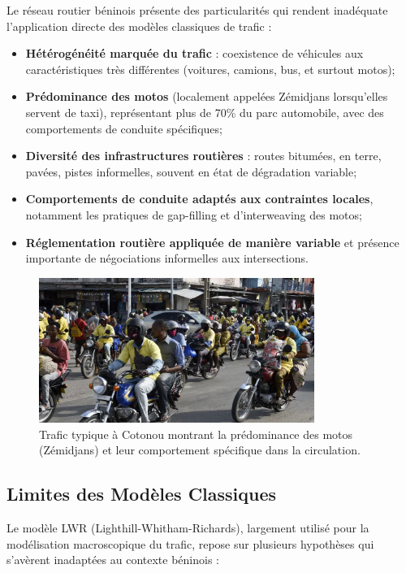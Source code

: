 Le réseau routier béninois présente des particularités qui rendent inadéquate l'application directe des modèles classiques de trafic :

\begin{itemize}
\item \textbf{Hétérogénéité marquée du trafic} : coexistence de véhicules aux caractéristiques très différentes (voitures, camions, bus, et surtout motos);
\item \textbf{Prédominance des motos} (localement appelées Zémidjans lorsqu'elles servent de taxi), représentant plus de 70\% du parc automobile, avec des comportements de conduite spécifiques;
\item \textbf{Diversité des infrastructures routières} : routes bitumées, en terre, pavées, pistes informelles, souvent en état de dégradation variable;
\item \textbf{Comportements de conduite adaptés aux contraintes locales}, notamment les pratiques de gap-filling et d'interweaving des motos;
\item \textbf{Réglementation routière appliquée de manière variable} et présence importante de négociations informelles aux intersections.
\end{itemize}

\begin{figure}[htbp]
\centering
\includegraphics[width=0.8\textwidth]{images/introduction/trafic_cotonou}
\caption{Trafic typique à Cotonou montrant la prédominance des motos (Zémidjans) et leur comportement spécifique dans la circulation.}
\label{fig:trafic_cotonou}
\end{figure}

\subsection{Limites des Modèles Classiques}
\label{subsec:limites_modeles}

Le modèle LWR (Lighthill-Whitham-Richards), largement utilisé pour la modélisation macroscopique du trafic, repose sur plusieurs hypothèses qui s'avèrent inadaptées au contexte béninois :

